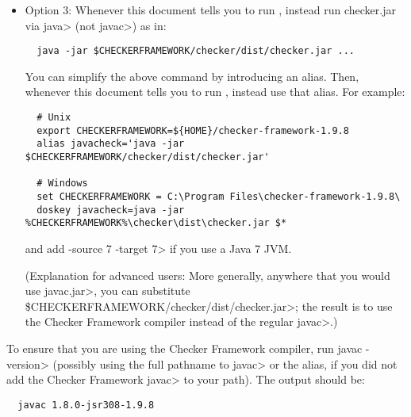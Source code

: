 \begin{itemize}
   \item
   Option 3:
   Whenever this document tells you to run , instead
   run checker.jar via \<java> (not \<javac>) as in:

\begin{Verbatim}
  java -jar $CHECKERFRAMEWORK/checker/dist/checker.jar ...
\end{Verbatim}

    You can simplify the above command by introducing an alias.  Then,
    whenever this document tells you to run , instead use that
    alias.  For example:

\begin{Verbatim}
  # Unix
  export CHECKERFRAMEWORK=${HOME}/checker-framework-1.9.8
  alias javacheck='java -jar $CHECKERFRAMEWORK/checker/dist/checker.jar'

  # Windows
  set CHECKERFRAMEWORK = C:\Program Files\checker-framework-1.9.8\
  doskey javacheck=java -jar %CHECKERFRAMEWORK%\checker\dist\checker.jar $*
\end{Verbatim}

   \noindent
   and add \<-source 7 -target 7> if you use a Java 7 JVM.

   (Explanation for advanced users:  More generally, anywhere that you would use \<javac.jar>, you can substitute
   \<\$CHECKERFRAMEWORK/checker/dist/checker.jar>;
   the result is to use the Checker
   Framework compiler instead of the regular \<javac>.)

\end{itemize}


To ensure that you are using the Checker Framework compiler, run
\<javac -version> (possibly using the
full pathname to \<javac> or the alias, if you did not add the Checker
Framework \<javac> to your path).
The output should be:

\begin{Verbatim}
  javac 1.8.0-jsr308-1.9.8
\end{Verbatim}




